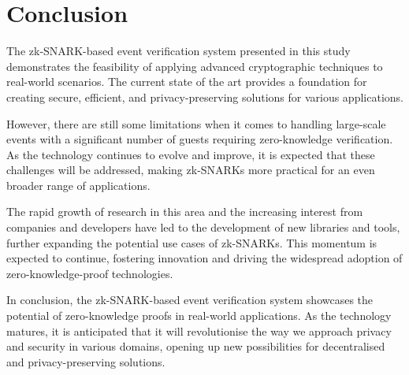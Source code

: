 \chapter{Conclusion}
The zk-SNARK-based event verification system presented in this study demonstrates the feasibility of applying advanced cryptographic techniques to real-world scenarios. The current state of the art provides a foundation for creating secure, efficient, and privacy-preserving solutions for various applications.

However, there are still some limitations when it comes to handling large-scale events with a significant number of guests requiring zero-knowledge verification. As the technology continues to evolve and improve, it is expected that these challenges will be addressed, making zk-SNARKs more practical for an even broader range of applications.

The rapid growth of research in this area and the increasing interest from companies and developers have led to the development of new libraries and tools, further expanding the potential use cases of zk-SNARKs. This momentum is expected to continue, fostering innovation and driving the widespread adoption of zero-knowledge-proof technologies.

In conclusion, the zk-SNARK-based event verification system showcases the potential of zero-knowledge proofs in real-world applications. As the technology matures, it is anticipated that it will revolutionise the way we approach privacy and security in various domains, opening up new possibilities for decentralised and privacy-preserving solutions.